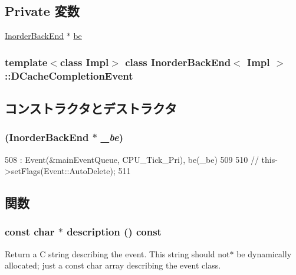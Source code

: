 \subsection*{Private 変数}
\begin{DoxyCompactItemize}
\item 
\hyperlink{classInorderBackEnd}{InorderBackEnd} $\ast$ \hyperlink{classInorderBackEnd_1_1DCacheCompletionEvent_a3baa3e0e5f56f4dff4d37bbe214925d7}{be}
\end{DoxyCompactItemize}
\subsubsection*{template$<$class Impl$>$ class InorderBackEnd$<$ Impl $>$::DCacheCompletionEvent}



\subsection{コンストラクタとデストラクタ}
\hypertarget{classInorderBackEnd_1_1DCacheCompletionEvent_a58396b39cb5df3ad178cfed0d1992c1c}{
\subsubsection[{DCacheCompletionEvent}]{ ({\bf InorderBackEnd} $\ast$ {\em \_\-be})}}
\label{classInorderBackEnd_1_1DCacheCompletionEvent_a58396b39cb5df3ad178cfed0d1992c1c}



\begin{DoxyCode}
508     : Event(&mainEventQueue, CPU_Tick_Pri), be(_be)
509 {
510 //    this->setFlags(Event::AutoDelete);
511 }
\end{DoxyCode}


\subsection{関数}
\hypertarget{classInorderBackEnd_1_1DCacheCompletionEvent_a5a14fe478e2393ff51f02e9b7be27e00}{
\subsubsection[{description}]{\setlength{\rightskip}{0pt plus 5cm}const char $\ast$ description () const}}
\label{classInorderBackEnd_1_1DCacheCompletionEvent_a5a14fe478e2393ff51f02e9b7be27e00}
Return a C string describing the event. This string should not$\ast$ be dynamically allocated; just a const char array describing the event class. 

